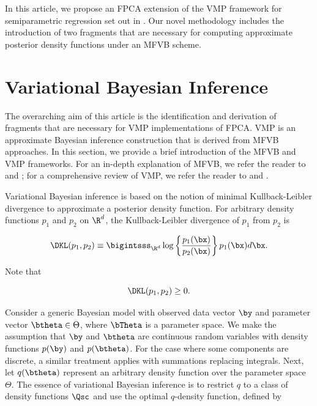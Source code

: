 \documentclass[12pt]{article}
\theoremstyle{plain}
\theoremstyle{definition}
\theoremstyle{remark}
\begin{document}
In this article, we propose an FPCA extension of the VMP framework for semiparametric regression set out in
. Our novel methodology includes the introduction of two fragments  that are necessary for
computing approximate posterior density functions under an MFVB scheme.


\section{Variational Bayesian Inference}
\label{sec:vbi}

The overarching aim of this article is the identification and derivation of fragments that are necessary for VMP
implementations of FPCA. VMP is an approximate Bayesian inference construction that is derived from MFVB
approaches. In this section, we provide a brief introduction of the MFVB and VMP frameworks. For an in-depth
explanation of MFVB, we refer the reader to  and ; for a comprehensive review
of VMP, we refer the reader to  and .

Variational Bayesian inference is based on the notion of minimal Kullback-Leibler divergence to approximate a
posterior density function. For arbitrary density functions $p_1$
and $p_2$ on $\R^d$, the Kullback-Leibler divergence of $p_1$ from $p_2$ is

\[
	\DKL (p_1, p_2) \equiv \bigintsss_{\R^d} \log \left\{ \frac{p_1 (\bx)}{p_2 (\bx)} \right\} p_1 (\bx) d\bx.
\]

\noindent Note that

\begin{equation}
	\DKL (p_1, p_2) \ge 0.
\label{nonneg_dkl}
\end{equation}

Consider a generic Bayesian model with observed data vector $\by$ and parameter vector $\btheta \in \Theta$,
where $\bTheta$ is a parameter space. We make the
assumption that $\by$ and $\btheta$ are continuous random variables with density functions $p(\by)$ and $p(\btheta)$.
For the case where some components are discrete, a similar treatment applies with summations replacing integrals.
Next, let $q (\btheta)$ represent an arbitrary density function over the parameter space $\Theta$. The essence of
variational Bayesian inference is to restrict $q$ to a class of density functions $\Qsc$ and use the optimal $q$-density
function, defined by
\end{document}
